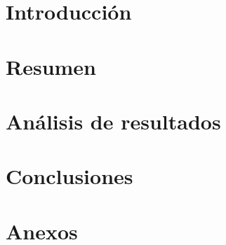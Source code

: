\documentclass{article}
\begin{document}

\tableofcontents
\newpage

\section{Introducción}

% 

\section{Resumen}

% 

% 




\section{Análisis de resultados}

\section{Conclusiones}

\section{Anexos}
% 
\end{document}

